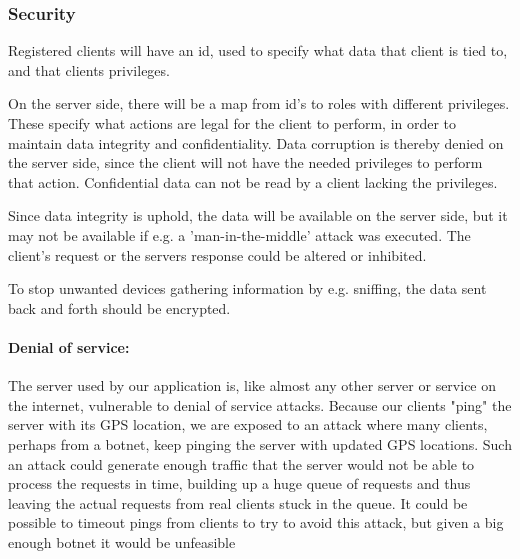 
\subsubsection{Security}
Registered clients will have an id, used to specify what data that client is tied to, and that clients privileges. 

On the server side, there will be a map from id's to roles with different privileges. These specify what actions are legal for the client to perform, in order to maintain data integrity and confidentiality. Data corruption is thereby denied on the server side, since the client will not have the needed privileges to perform that action. Confidential data can not be read by a client lacking the privileges.

Since data integrity is uphold, the data will be available on the server side, but it may not be available if e.g. a 'man-in-the-middle' attack was executed. The client's request or the servers response could be altered or inhibited.

To stop unwanted devices gathering information by e.g. sniffing, the data sent back and forth should be encrypted.



\paragraph{Denial of service:}

The server used by our application is, like almost any other server or service on the internet, vulnerable to denial of service attacks. Because our clients "ping" the server with its GPS location, we are exposed to an attack where many clients, perhaps from a botnet, keep pinging the server with updated GPS locations. Such an attack could generate enough traffic that the server would not be able to process the requests in time, building up a huge queue of requests and thus leaving the actual requests from real clients stuck in the queue. It could be possible to timeout pings from clients to try to avoid this attack, but given a big enough botnet it would be unfeasible